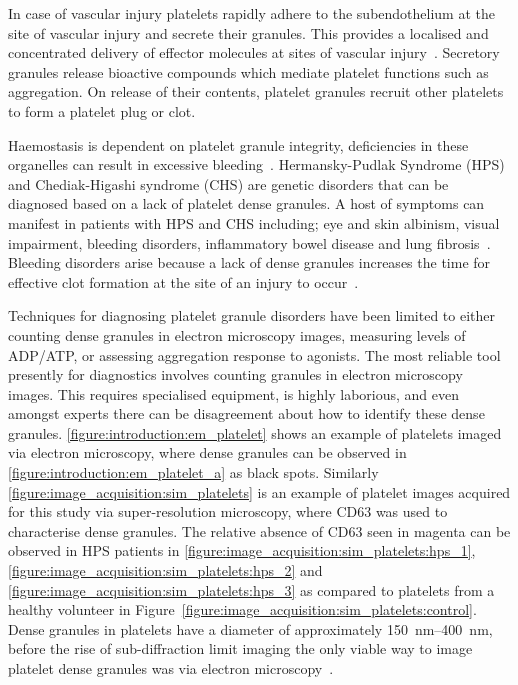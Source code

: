 In case of vascular injury platelets rapidly adhere to the subendothelium at the site of vascular injury and secrete their granules. This provides a localised and concentrated delivery of effector molecules at sites of vascular injury~\cite{Reed2000}. Secretory granules release bioactive compounds which mediate platelet functions such as aggregation. On release of their contents, platelet granules recruit other platelets to form a platelet plug or clot.

Haemostasis is dependent on platelet granule integrity, deficiencies in these organelles can result in excessive bleeding~\cite{Nurden2014}. Hermansky-Pudlak Syndrome (HPS) and Chediak-Higashi syndrome (CHS) are genetic disorders that can be diagnosed based on a lack of platelet dense granules. A host of symptoms can manifest in patients with HPS and CHS including; eye and skin albinism, visual impairment, bleeding disorders, inflammatory bowel disease and lung fibrosis~\cite{Wei2006}. Bleeding disorders arise because a lack of dense granules increases the time for effective clot formation at the site of an injury to occur~\cite{Seward2013}.

Techniques for diagnosing platelet granule disorders have been limited to either counting dense granules in electron microscopy images, measuring levels of ADP/ATP, or assessing aggregation response to agonists. The most reliable tool presently for diagnostics involves counting granules in electron microscopy images. This requires specialised equipment, is highly laborious, and even amongst experts there can be disagreement about how to identify these dense granules. \autoref{figure:introduction:em_platelet} shows an example of platelets imaged via electron microscopy, where dense granules can be observed in \autoref{figure:introduction:em_platelet_a} as black spots. Similarly \autoref{figure:image_acquisition:sim_platelets} is an example of platelet images acquired for this study via super-resolution microscopy, where CD63 was used to characterise dense granules. The relative absence of CD63 seen in magenta can be observed in HPS patients in \autoref{figure:image_acquisition:sim_platelets:hps_1}, \autoref{figure:image_acquisition:sim_platelets:hps_2} and \autoref{figure:image_acquisition:sim_platelets:hps_3} as compared to platelets from a healthy volunteer in Figure~\autoref{figure:image_acquisition:sim_platelets:control}. Dense granules in platelets have a diameter of approximately \SIrange{150}{400}{\nano\meter}, before the rise of sub-diffraction limit imaging the only viable way to image platelet dense granules was via electron microscopy~\cite{Rumbaut2010}.

